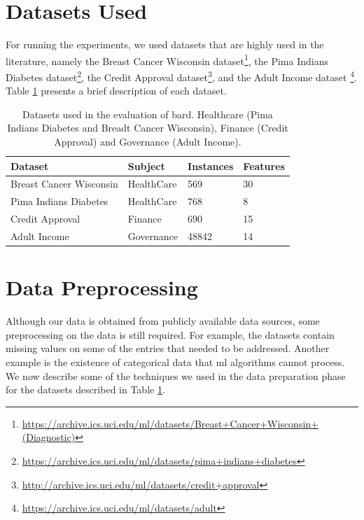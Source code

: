 



\section{Datasets Used}
\label{sec:DatasetsImplementation}

For running the experiments, we used datasets that are highly used in the literature, namely the Breast Cancer Wisconsin dataset\footnote{\url{https://archive.ics.uci.edu/ml/datasets/Breast+Cancer+Wisconsin+(Diagnostic)}}, the Pima Indians Diabetes dataset\footnote{\url{https://archive.ics.uci.edu/ml/datasets/pima+indians+diabetes}}, the Credit Approval dataset\footnote{\url{http://archive.ics.uci.edu/ml/datasets/credit+approval}}, and the Adult Income dataset \footnote{\url{https://archive.ics.uci.edu/ml/datasets/adult}}. Table \ref{table:datasets} presents a brief description of each dataset.


\begin{table}[H]
\centering
\caption{Datasets used in the evaluation of \acs{bard}. Healthcare (Pima Indians Diabetes and Breadt Cancer Wisconsin), Finance (Credit Approval) and Governance (Adult Income).}
\label{table:datasets}
\begin{tabular}{|l|l|l|l|}
\hline
\textbf{Dataset} & \textbf{Subject} & \textbf{Instances} & \textbf{Features} \\ \hline
 Breast Cancer Wisconsin  &  HealthCare  & 569    & 30       \\ \hline
 Pima Indians Diabetes    &  HealthCare  & 768    &  8       \\ \hline
 Credit Approval          &  Finance     & 690    & 15       \\ \hline
 Adult Income             &  Governance  & 48842  & 14       \\ \hline 
\end{tabular}
\end{table}



\section{Data Preprocessing}
\label{sec:DataPreProcessingImplementation}

Although our data is obtained from publicly available data sources, some preprocessing on the data is still required.
For example, the datasets contain missing values on some of the entries that needed to be addressed. Another example is the existence of categorical data that \ac{ml} algorithms cannot process. We now describe some of the techniques we used in the data preparation phase for the datasets described in Table \ref{table:datasets}.


